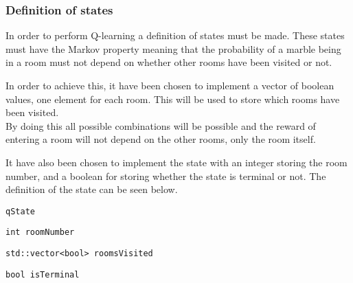 \documentclass[../Head/Main.tex]{subfiles}
\begin{document}
\subsubsection{Definition of states}
In order to perform Q-learning a definition of states must be made. These states must have the Markov property meaning that the probability of a marble being in a room must not depend on whether other rooms have been visited or not.\par 
In order to achieve this, it have been chosen to implement a vector of boolean values, one element for each room. This will be used to store which rooms have been visited.\\
By doing this all possible combinations will be possible and the reward of entering a room will not depend on the other rooms, only the room itself.\par 
It have also been chosen to implement the state with an integer storing the room number, and a boolean for storing whether the state is terminal or not. The definition of the state can be seen below.
\begin{Indentation}
	\item \texttt{qState} \vspace{-2pt}
	\begin{Indentation}
		\item \texttt{int roomNumber} \vspace{-2pt}
		\item \texttt{std::vector<bool> roomsVisited} \vspace{-2pt}
		\item \texttt{bool isTerminal}
	\end{Indentation}
\end{Indentation}




\end{document}
